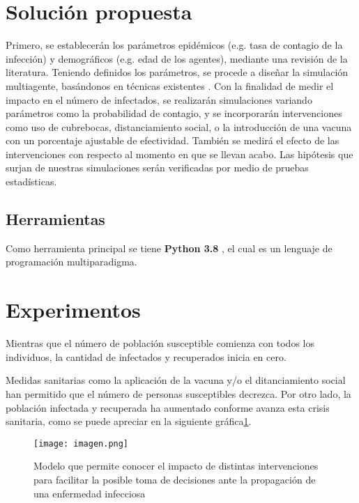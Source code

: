 \documentclass[a4]{sciposter}
\begin{document}
\begin{multicols}{2}
\section{Solución propuesta}

Primero, se establecerán los parámetros epidémicos (e.g. tasa de contagio de la infección) y demográficos (e.g. edad de los agentes), mediante una revisión de la literatura. Teniendo definidos los parámetros, se procede a diseñar la simulación multiagente, basándonos en técnicas existentes \cite{transporte}. Con la finalidad de medir el impacto en el número de infectados, se realizarán simulaciones variando parámetros como la probabilidad
de contagio, y se incorporarán intervenciones como uso de cubrebocas, distanciamiento social, o la introducción de una vacuna con un porcentaje ajustable de efectividad. También se medirá el efecto de las intervenciones con respecto al momento en que se llevan acabo. Las hipótesis que surjan de nuestras simulaciones serán verificadas por medio de pruebas estadísticas.

\subsection*{Herramientas}

Como herramienta principal se tiene \textbf{Python 3.8} \citep{python}, el cual es un lenguaje de programación multiparadigma.

\section{Experimentos}

Mientras que el número de población susceptible comienza con todos los individuos, la cantidad de infectados y recuperados inicia en cero.\par
Medidas sanitarias como la aplicación de la vacuna y/o el ditanciamiento social han permitido que el número de personas susceptibles decrezca. Por otro lado, la población infectada y recuperada ha aumentado conforme avanza esta crisis sanitaria, como se puede apreciar en la siguiente gráfica\ref{imagen}.

\begin{figure}[h]
\setcounter{figure}{1}
\captionsetup{type=figure}
\begin{center}
   \texttt{[image: imagen.png]}
   \end{center}
    \caption{Modelo que permite conocer el impacto de distintas intervenciones para facilitar la posible toma de decisiones ante la propagación de una enfermedad infecciosa}
    \label{imagen}
    \centering
\end{figure}


\end{multicols}
\end{document}

